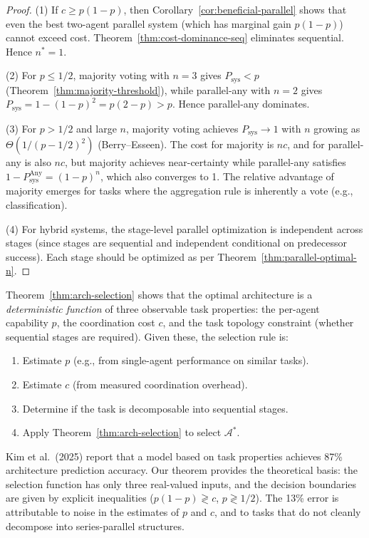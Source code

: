 \begin{proof}
(1) If $c \geq p(1-p)$, then Corollary~\ref{cor:beneficial-parallel} shows that
even the best two-agent parallel system (which has marginal gain $p(1-p)$) cannot
exceed cost. Theorem~\ref{thm:cost-dominance-seq} eliminates sequential. Hence
$n^* = 1$.

(2) For $p \leq 1/2$, majority voting with $n = 3$ gives $P_{\mathrm{sys}} < p$
(Theorem~\ref{thm:majority-threshold}), while parallel-any with $n = 2$ gives
$P_{\mathrm{sys}} = 1-(1-p)^2 = p(2-p) > p$. Hence parallel-any dominates.

(3) For $p > 1/2$ and large $n$, majority voting achieves
$P_{\mathrm{sys}} \to 1$ with $n$ growing as $\Theta(1/(p-1/2)^2)$
(Berry--Esseen). The cost for majority is $nc$, and for parallel-any is also $nc$,
but majority achieves near-certainty while parallel-any satisfies
$1 - P_{\mathrm{sys}}^{\mathrm{Any}} = (1-p)^n$, which also converges to 1.
The relative advantage of majority emerges for tasks where the aggregation
rule is inherently a vote (e.g., classification).

(4) For hybrid systems, the stage-level parallel optimization is independent
across stages (since stages are sequential and independent conditional on
predecessor success). Each stage should be optimized as per
Theorem~\ref{thm:parallel-optimal-n}.
\end{proof}

\begin{remark}
\label{rmk:87-percent}
Theorem~\ref{thm:arch-selection} shows that the optimal architecture is a
\emph{deterministic function} of three observable task properties: the per-agent
capability $p$, the coordination cost $c$, and the task topology constraint
(whether sequential stages are required). Given these, the selection rule is:
\begin{enumerate}
  \item Estimate $p$ (e.g., from single-agent performance on similar tasks).
  \item Estimate $c$ (from measured coordination overhead).
  \item Determine if the task is decomposable into sequential stages.
  \item Apply Theorem~\ref{thm:arch-selection} to select $\mathcal{A}^*$.
\end{enumerate}
Kim et al.\ (2025) report that a model based on task properties achieves 87\%
architecture prediction accuracy. Our theorem provides the theoretical basis:
the selection function has only three real-valued inputs, and the decision
boundaries are given by explicit inequalities ($p(1-p) \gtrless c$,
$p \gtrless 1/2$). The 13\% error is attributable to noise in the estimates
of $p$ and $c$, and to tasks that do not cleanly decompose into series-parallel
structures.
\end{remark}

